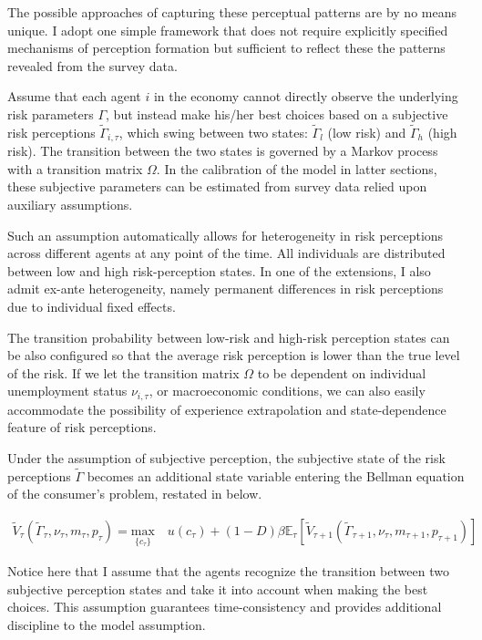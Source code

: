 The possible approaches of capturing these perceptual patterns are by no means unique. I adopt one simple framework that does not require explicitly specified mechanisms of perception formation but sufficient to reflect these the patterns revealed from the survey data.

Assume that each agent $i$ in the economy cannot directly observe the underlying risk parameters $\Gamma$, but instead make his/her best choices based on a subjective risk perceptions  $\tilde \Gamma_{i,\tau}$, which swing between two states: $\tilde \Gamma_l$ (low risk) and $\tilde \Gamma_h$ (high risk). The transition between the two states is governed by a Markov process with a transition matrix $\Omega$. In the calibration of the model in latter sections, these subjective parameters can be estimated from survey data relied upon auxiliary assumptions. 

Such an assumption automatically allows for heterogeneity in risk perceptions across different agents at any point of the time. All individuals are distributed between low and high risk-perception states. In one of the extensions, I also admit ex-ante heterogeneity, namely permanent differences in risk perceptions due to individual fixed effects.  

The transition probability between low-risk and high-risk perception states can be also configured so that the average risk perception is lower than the true level of the risk. If we let the transition matrix $\Omega$ to be dependent on individual unemployment status $\nu_{i,\tau}$, or macroeconomic conditions, we can also easily accommodate the possibility of experience extrapolation and state-dependence feature of risk perceptions. 

Under the assumption of subjective perception, the subjective state of the risk perceptions $\tilde \Gamma$ becomes an additional state variable entering the Bellman equation of the consumer's problem, restated in below.

\begin{equation}
\begin{split}
\tilde V_{\tau}(\tilde \Gamma_\tau, \nu_\tau, m_\tau, p_\tau) = \underset{\{c_\tau\}}{\textrm{max}} \quad u(c_\tau) + (1-D)\beta \mathbb{E}_{\tau}\left[\tilde V_{\tau+1}(\tilde \Gamma_{\tau+1}, \nu_\tau,m_{\tau+1}, p_{\tau+1})\right] 
\end{split}
\end{equation}

Notice here that I assume that the agents recognize the transition between two subjective perception states and take it into account when making the best choices. This assumption guarantees time-consistency and provides additional discipline to the model assumption.  

